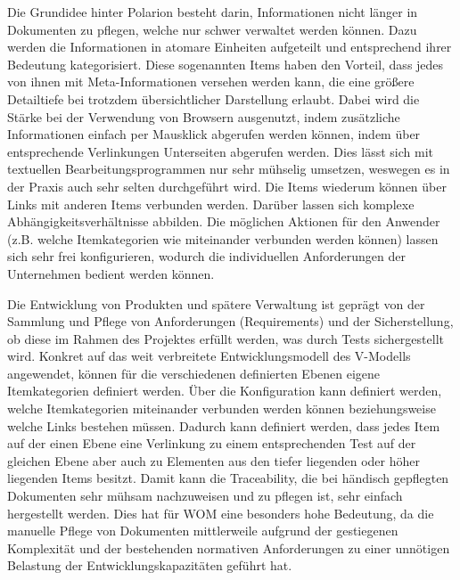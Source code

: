 \documentclass[a4paper,12pt]{report}
\begin{document}
Die Grundidee hinter Polarion besteht darin, Informationen nicht länger in Dokumenten zu pflegen, welche nur schwer verwaltet werden können. Dazu werden die Informationen in atomare Einheiten aufgeteilt und entsprechend ihrer Bedeutung kategorisiert. Diese sogenannten Items haben den Vorteil, dass jedes von ihnen mit Meta-Informationen versehen werden kann, die eine größere Detailtiefe bei trotzdem übersichtlicher Darstellung erlaubt. Dabei wird die Stärke bei der Verwendung von Browsern ausgenutzt, indem zusätzliche Informationen einfach per Mausklick abgerufen werden können, indem über entsprechende Verlinkungen Unterseiten abgerufen werden. Dies lässt sich mit textuellen Bearbeitungsprogrammen nur sehr mühselig umsetzen, weswegen es in der Praxis auch sehr selten durchgeführt wird. Die Items wiederum können über Links mit anderen Items verbunden werden. Darüber lassen sich komplexe Abhängigkeitsverhältnisse abbilden. Die möglichen Aktionen für den Anwender (z.B. welche Itemkategorien wie miteinander verbunden werden können) lassen sich sehr frei konfigurieren, wodurch die individuellen Anforderungen der Unternehmen bedient werden können.

Die Entwicklung von Produkten und spätere Verwaltung ist geprägt von der Sammlung und Pflege von Anforderungen (Requirements) und der Sicherstellung, ob diese im Rahmen des Projektes erfüllt werden, was durch Tests sichergestellt wird. Konkret auf das weit verbreitete Entwicklungsmodell des V-Modells angewendet, können für die verschiedenen definierten Ebenen eigene Itemkategorien definiert werden. Über die Konfiguration kann definiert werden, welche Itemkategorien miteinander verbunden werden können beziehungsweise welche Links bestehen müssen. Dadurch kann definiert werden, dass jedes Item auf der einen Ebene eine Verlinkung zu einem entsprechenden Test auf der gleichen Ebene aber auch zu Elementen aus den tiefer liegenden oder höher liegenden Items besitzt. Damit kann die Traceability, die bei händisch gepflegten Dokumenten sehr mühsam nachzuweisen und zu pflegen ist, sehr einfach hergestellt werden. Dies hat für WOM eine besonders hohe Bedeutung, da die manuelle Pflege von Dokumenten mittlerweile aufgrund der gestiegenen Komplexität und der bestehenden normativen Anforderungen zu einer unnötigen Belastung der Entwicklungskapazitäten geführt hat.
\end{document}
